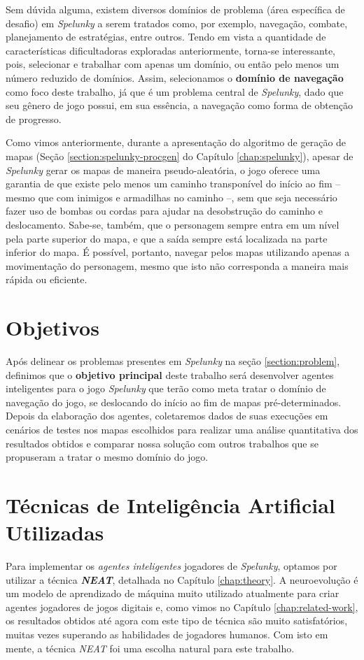 Sem dúvida alguma, existem diversos domínios de problema (área específica de
desafio) em \textit{Spelunky} a serem tratados como, por exemplo, navegação,
combate, planejamento de estratégias, entre outros. Tendo em vista a quantidade
de características dificultadoras exploradas anteriormente, torna-se
interessante, pois, selecionar e trabalhar com apenas um domínio, ou então pelo
menos um número reduzido de domínios. Assim, selecionamos o \textbf{domínio de
navegação} como foco deste trabalho, já que é um problema central de
\textit{Spelunky}, dado que seu gênero de jogo possui, em sua essência, a
navegação como forma de obtenção de progresso.

Como vimos anteriormente, durante a apresentação do algoritmo de geração de
mapas (Seção \ref{section:spelunky-procgen} do Capítulo \ref{chap:spelunky}),
apesar de \textit{Spelunky} gerar os mapas de maneira pseudo-aleatória, o jogo
oferece uma garantia de que existe pelo menos um caminho transponível do início
ao fim -- mesmo que com inimigos e armadilhas no caminho --, sem que seja
necessário fazer uso de bombas ou cordas para ajudar na desobstrução do caminho
e deslocamento. Sabe-se, também, que o personagem sempre entra em um nível pela
parte superior do mapa, e que a saída sempre está localizada na parte inferior
do mapa. É possível, portanto, navegar pelos mapas utilizando apenas a
movimentação do personagem, mesmo que isto não corresponda a maneira mais rápida
ou eficiente.


\section{\label{section:objectives}Objetivos}
Após delinear os problemas presentes em \textit{Spelunky} na seção
\ref{section:problem}, definimos que o \textbf{objetivo principal} deste
trabalho será desenvolver agentes inteligentes para o jogo \textit{Spelunky} que
terão como meta tratar o domínio de navegação do jogo, se deslocando do início
ao fim de mapas pré-determinados. Depois da elaboração dos agentes, coletaremos
dados de suas execuções em cenários de testes nos mapas escolhidos para realizar
uma análise quantitativa dos resultados obtidos e comparar nossa solução com
outros trabalhos que se propuseram a tratar o mesmo domínio do jogo.


\section{\label{section:techniques}Técnicas de Inteligência Artificial
Utilizadas}
Para implementar os \textit{agentes inteligentes} jogadores de
\textit{Spelunky}, optamos por utilizar a técnica \textbf{\textit{NEAT}},
detalhada no Capítulo \ref{chap:theory}. A neuroevolução é um modelo de
aprendizado de máquina muito utilizado atualmente para criar agentes jogadores
de jogos digitais\cite{DBLP:journals/corr/RisiT14} e, como vimos no Capítulo
\ref{chap:related-work}, os resultados obtidos até agora com este tipo de
técnica são muito satisfatórios, muitas vezes superando as habilidades de
jogadores humanos\cite{NeuroEvolutionAtari}. Com isto em mente, a técnica
\textit{NEAT} foi uma escolha natural para este trabalho.

